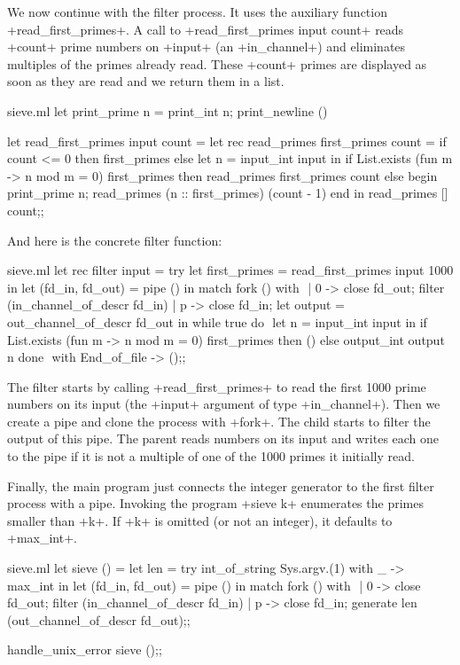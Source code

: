 We now continue with the filter process. It uses the auxiliary function
\ml+read_first_primes+. A call to \ml+read_first_primes input count+ 
reads \ml+count+ prime numbers on \ml+input+ (an \ml+in_channel+) and eliminates
multiples of the primes already read. These \ml+count+ primes are
displayed as soon as they are read and we return them in a list.
%
\begin{listingcodefile}[style=numbers]{sieve.ml}
let print_prime n = print_int n; print_newline ()

let read_first_primes input count =
  let rec read_primes first_primes count =
    if count <= 0 then first_primes else
    let n = input_int input in
    if List.exists (fun m -> n mod m = 0) first_primes then
      read_primes first_primes count
    else begin
      print_prime n;
      read_primes (n :: first_primes) (count - 1)
    end 
  in
  read_primes [] count$\label{prog:pprime}$;;
\end{listingcodefile}
%
And here is the concrete filter function:  
%
\begin{listingcodefile}[style=numbers]{sieve.ml}
let rec filter input =
  try 
    let first_primes = read_first_primes input 1000 in
    let (fd_in, fd_out) = pipe () in
    match fork () with $\label{prog:sievefilterfork}$
    | 0 ->
        close fd_out;
        filter (in_channel_of_descr fd_in)
    | p ->
        close fd_in;
        let output = out_channel_of_descr fd_out in
        while true do $\label{prog:sievefilterwhile}$
          let n = input_int input in
          if List.exists (fun m -> n mod m = 0) first_primes then ()
          else output_int output n
        done $\label{prog:sievefilterdone}$
  with End_of_file -> ();;
\end{listingcodefile}
%
The filter starts by calling \ml+read_first_primes+ to read the first
1000 prime numbers on its input (the \ml+input+ argument of type
\ml+in_channel+). Then we create a pipe and clone the process with
\ml+fork+. The child starts to filter the output of this pipe.  The
parent reads numbers on its input and writes each one to the pipe if it
is not a multiple of one of the 1000 primes it initially read.

Finally, the main program just connects the integer generator to the
first filter process with a pipe. Invoking the program \ml+sieve k+
enumerates the primes smaller than \ml+k+. If \ml+k+ is omitted (or
not an integer), it defaults to \ml+max_int+.
%
\begin{listingcodefile}[style=numbers]{sieve.ml}
let sieve () =
  let len = try int_of_string Sys.argv.(1) with _ -> max_int in
  let (fd_in, fd_out) = pipe () in
  match fork () with $\label{prog:sievefork}$
  | 0 ->
      close fd_out;
      filter (in_channel_of_descr fd_in)
  | p ->
      close fd_in;
      generate len (out_channel_of_descr fd_out);; $\label{prog:gen}$

handle_unix_error sieve ();;
\end{listingcodefile}
%

